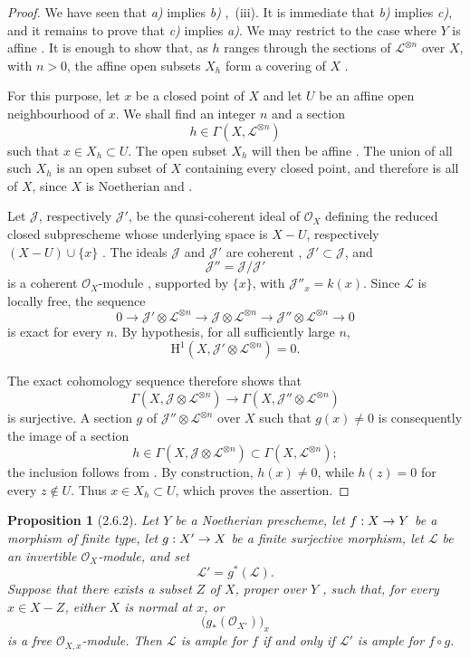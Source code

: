\documentclass[oneside]{amsart}
\theoremstyle{ega-env-style}
\theoremstyle{ega-thm-env-style}
\newtheorem*{proposition}{Proposition}
\theoremstyle{ega-defn-env-style}
\def\mathcal{\mathscr}
\def\sh{\mathcal}                   %
\def\HH{\mathrm{H}}                 %
\def\kres{k}                        %
\renewcommand{\to}{\mathchoice{\longrightarrow}{\rightarrow}{\rightarrow}{\rightarrow}}
\newcommand{\oldpage}[2][]{{\marginnote{\normalfont{\textbf{#1}~|~#2}}}\ignorespaces}
\let\EGAOriginalLabel\label
\renewcommand{\label}[1]{\phantomsection\EGAOriginalLabel{#1}}
\begin{document}
\begin{proof}
We have seen that \emph{a)} implies \emph{b)} ,~(iii).
It is immediate that \emph{b)} implies \emph{c)}, and it remains to prove
that \emph{c)} implies \emph{a)}.
We may restrict to the case where $Y$ is affine .
It is enough to show that, as $h$ ranges through the sections of
$\sh{L}^{\otimes n}$ over $X$, with $n>0$, the affine open subsets $X_h$
form a covering of $X$ .

For this purpose, let $x$ be a closed point of $X$ and let $U$ be an
affine open neighbourhood of $x$.
We shall find an integer $n$ and a section
\[
  h\in\Gamma(X,\sh{L}^{\otimes n})
\]
such that $x\in X_h\subset U$.
The open subset $X_h$ will then be affine .
The union of all such $X_h$ is an open subset of $X$ containing every
closed point, and therefore is all of $X$, since $X$ is Noetherian
 and .

Let $\sh{J}$, respectively $\sh{J}'$, be the quasi-coherent ideal of
$\sh{O}_X$ defining the reduced closed subprescheme whose underlying
space is $X-U$, respectively $(X-U)\cup\{x\}$ .
The ideals $\sh{J}$ and $\sh{J}'$ are coherent ,
$\sh{J}'\subset\sh{J}$, and
\[
  \sh{J}''=\sh{J}/\sh{J}'
\]
is a coherent $\sh{O}_X$-module , supported by
$\{x\}$, with $\sh{J}''_x=\kres(x)$.
Since $\sh{L}$ is locally free, the sequence
\[
  0\longrightarrow
  \sh{J}'\otimes\sh{L}^{\otimes n}
  \longrightarrow
  \sh{J}\otimes\sh{L}^{\otimes n}
  \longrightarrow
  \sh{J}''\otimes\sh{L}^{\otimes n}
  \longrightarrow0
\]
is exact for every $n$.
By hypothesis, for all sufficiently large $n$,
\[
  \HH^1(X,\sh{J}'\otimes\sh{L}^{\otimes n})=0.
\]

\oldpage[III]{112}

The exact cohomology sequence therefore shows that
\[
  \Gamma(X,\sh{J}\otimes\sh{L}^{\otimes n})
  \longrightarrow
  \Gamma(X,\sh{J}''\otimes\sh{L}^{\otimes n})
\]
is surjective.
A section $g$ of $\sh{J}''\otimes\sh{L}^{\otimes n}$ over $X$ such that
$g(x)\neq0$ is consequently the image of a section
\[
  h\in\Gamma(X,\sh{J}\otimes\sh{L}^{\otimes n})
  \subset\Gamma(X,\sh{L}^{\otimes n});
\]
the inclusion follows from .
By construction, $h(x)\neq0$, while $h(z)=0$ for every $z\notin U$.
Thus $x\in X_h\subset U$, which proves the assertion.
\end{proof}

\begin{proposition}[2.6.2]
\label{III.2.6.2}
Let $Y$ be a Noetherian prescheme, let $f:X\to Y$ be a morphism of
finite type, let $g:X'\to X$ be a finite surjective morphism, let
$\sh{L}$ be an invertible $\sh{O}_X$-module, and set
\[
  \sh{L}'=g^*(\sh{L}).
\]
Suppose that there exists a subset $Z$ of $X$, proper over $Y$
, such that, for every $x\in X-Z$, either $X$ is
normal at $x$, or
\[
  \bigl(g_*(\sh{O}_{X'})\bigr)_x
\]
is a free $\sh{O}_{X,x}$-module.
Then $\sh{L}$ is ample for $f$ if and only if $\sh{L}'$ is ample for
$f\circ g$.
\end{proposition}
\end{document}
